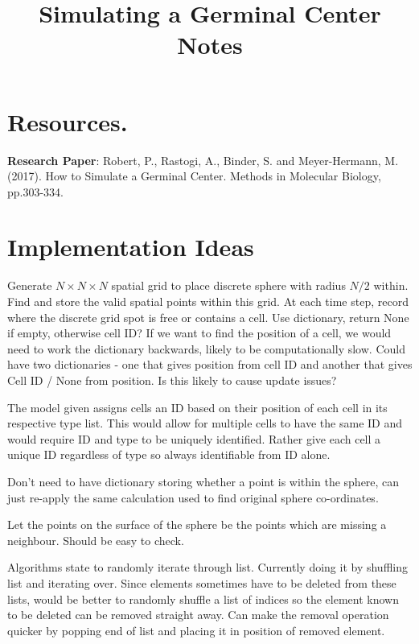 \documentclass[english]{article}
\begin{document}
\title{Simulating a Germinal Center Notes}
\maketitle

\tableofcontents
\pagebreak	

\section{Resources.}
\textbf{Research Paper}: Robert, P., Rastogi, A., Binder, S. and Meyer-Hermann, M. (2017). How to Simulate a Germinal Center. Methods in Molecular Biology, pp.303-334.


\section{Implementation Ideas}

Generate $N\times N\times N$ spatial grid to place discrete sphere with radius $N/2$ within. Find and store the valid spatial points within this grid. At each time step, record where the discrete grid spot is free or contains a cell. Use dictionary, return None if empty, otherwise cell ID? If we want to find the position of a cell, we would need to work the dictionary backwards, likely to be computationally slow. Could have two dictionaries - one that gives position from cell ID and another that gives Cell ID / None from position. Is this likely to cause update issues?

The model given assigns cells an ID based on their position of each cell in its respective type list. This would allow for multiple cells to have the same ID and would require ID and type to be uniquely identified. Rather give each cell a unique ID regardless of type so always identifiable from ID alone. 

Don't need to have dictionary storing whether a point is within the sphere, can just re-apply the same calculation used to find original sphere co-ordinates. 

Let the points on the surface of the sphere be the points which are missing a neighbour. Should be easy to check.

Algorithms state to randomly iterate through list. Currently doing it by shuffling list and iterating over. Since elements sometimes have to be deleted from these lists, would be better to randomly shuffle a list of indices so the element known to be deleted can be removed straight away. Can make the removal operation quicker by popping end of list and placing it in position of removed element. 
\end{document}
